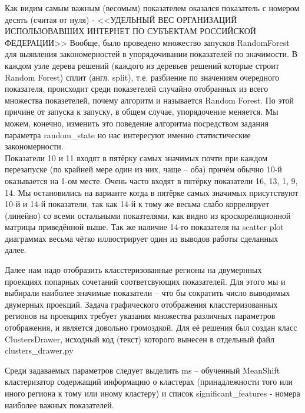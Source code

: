 \documentclass[11pt]{article}
\begin{document}
    Как видим самым важным (весомым) показателем оказался
показатель с номером десять (считая от нуля) -
<<УДЕЛЬНЫЙ ВЕС ОРГАНИЗАЦИЙ ИСПОЛЬЗОВАВШИХ  ИНТЕРНЕТ ПО СУБЪЕКТАМ РОССИЙСКОЙ ФЕДЕРАЦИИ>>
Вообще, было проведено множество запусков RandomForest для выявления
закономерностей в упорядочивании показателей по значимости. В каждом
узле дерева решений (каждого из деревьев решений которые строит Random
Forest) сплит (англ. split), т.е. разбиение по значениям очередного
показателя, происходит среди показетелей случайно отобранных из всего
множества показетелей, почему алгоритм и называется Random Forest. По
этой причине от запуска к запуску, в общем случае, упорядочение
меняется. Мы можем, конечно, изменить это поведение алгоритма
посредством задания параметра random\_state но нас интересуют именно
статистические закономерности. \\ Показатели 10 и 11 входят
в пятёрку самых значимых почти при каждом перезапуске (по крайней мере
один из них, чаще -- оба) причём обычно 10-й оказывается на 1-ом месте.
Очень часто входят в пятёрку показатели 16, 13, 1, 9, 14. Мы
остановились на варианте когда в пятёрке самых значимых присутствуют
10-й и 14-й показатели, так как 14-й к тому же весьма слабо коррелирует
(линейно) со всеми остальными показтелями, как видно из
кроскореляционной матрицы приведённой выше. Так же наличие 14-го
показателя на scatter plot диаграммах весьма чётко иллюстрирует один из
выводов работы сделанных далее.

    Далее нам надо отобразить класстеризованные регионы на двумернных
проекциях попарных сочетаний соответсвующих показателей. Для этого мы и
выбирали наиболее значимые показатели -- что бы сократить число выводимых
двумерных проекций. Задача графического отображения класстеризованных
регионов на проекциях требует указания множества различных параметров
отображения, и является довольно громоздкой. Для её решения был создан
класс ClustersDrawer, исходный код (текст) которого вынесен в отдельный
файл clusters\_drawer.py

    Среди задаваемых параметров следует выделить ms -- обученный MeanShift
кластеризатор содержащий информацию о кластерах (принадлежности того или
иного региона к тому или иному кластеру) и список significant\_features
- номера наиболее важных показателей.

    \begin{center}
    \end{center}
    { \hspace*{\fill} \\}
    
\end{document}
